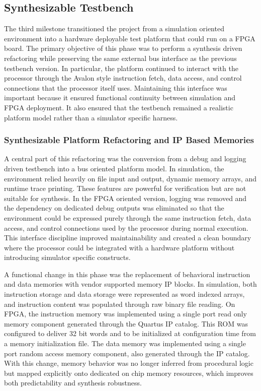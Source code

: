 \documentclass[12pt]{article}
\begin{document}
\subsection{Synthesizable Testbench}
The third milestone transitioned the project from a simulation oriented environment into a hardware deployable test platform that could run on a FPGA board. The primary objective of this phase was to perform a synthesis driven refactoring while preserving the same external bus interface as the previous testbench version. In particular, the platform continued to interact with the processor through the Avalon style instruction fetch, data access, and control connections that the processor itself uses. Maintaining this interface was important because it ensured functional continuity between simulation and FPGA deployment. It also ensured that the testbench remained a realistic platform model rather than a simulator specific harness.

\subsubsection{Synthesizable Platform Refactoring and IP Based Memories}
A central part of this refactoring was the conversion from a debug and logging driven testbench into a bus oriented platform model. In simulation, the environment relied heavily on file input and output, dynamic memory arrays, and runtime trace printing. These features are powerful for verification but are not suitable for synthesis. In the FPGA oriented version, logging was removed and the dependency on dedicated debug outputs was eliminated so that the environment could be expressed purely through the same instruction fetch, data access, and control connections used by the processor during normal execution. This interface discipline improved maintainability and created a clean boundary where the processor could be integrated with a hardware platform without introducing simulator specific constructs.

A functional change in this phase was the replacement of behavioral instruction and data memories with vendor supported memory IP blocks. In simulation, both instruction storage and data storage were represented as word indexed arrays, and instruction content was populated through raw binary file reading. On FPGA, the instruction memory was implemented using a single port read only memory component generated through the Quartus IP catalog. This ROM was configured to deliver 32 bit words and to be initialized at configuration time from a memory initialization file. The data memory was implemented using a single port random access memory component, also generated through the IP catalog. With this change, memory behavior was no longer inferred from procedural logic but mapped explicitly onto dedicated on chip memory resources, which improves both predictability and synthesis robustness.
\end{document}
